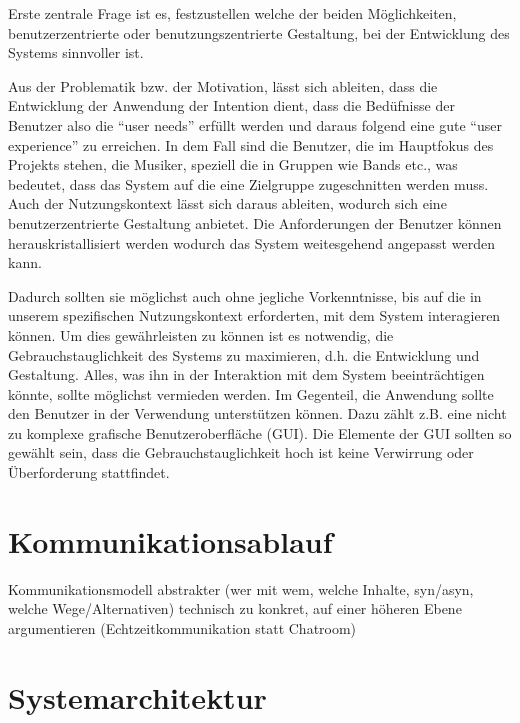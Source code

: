 \documentclass[12pt]{scrartcl}
\begin{document}
Erste zentrale Frage ist es, festzustellen welche der beiden Möglichkeiten, benutzerzentrierte oder benutzungszentrierte Gestaltung, bei der Entwicklung des Systems sinnvoller ist.

Aus der Problematik bzw. der Motivation, lässt sich ableiten, dass die Entwicklung der Anwendung der Intention dient, dass die Bedüfnisse der Benutzer also die “user needs” erfüllt werden und daraus folgend eine gute “user experience” zu erreichen. 
In dem Fall sind die Benutzer, die im Hauptfokus des Projekts stehen, die Musiker, speziell die in Gruppen wie Bands etc., was bedeutet, dass das System auf die eine Zielgruppe zugeschnitten werden muss. Auch der Nutzungskontext lässt sich daraus ableiten, wodurch sich eine benutzerzentrierte Gestaltung anbietet. Die Anforderungen der Benutzer können herauskristallisiert werden wodurch das System weitesgehend angepasst werden kann.

Dadurch sollten sie möglichst auch ohne jegliche Vorkenntnisse, bis auf die in unserem spezifischen Nutzungskontext erforderten, mit dem System interagieren können.
Um dies gewährleisten zu können ist es notwendig, die Gebrauchstauglichkeit des Systems zu maximieren, d.h. die Entwicklung und Gestaltung. Alles, was ihn in der Interaktion mit dem System beeinträchtigen könnte, sollte möglichst vermieden werden. Im Gegenteil, die Anwendung sollte den Benutzer in der Verwendung unterstützen können. Dazu zählt z.B. eine nicht zu komplexe grafische Benutzeroberfläche (GUI). Die Elemente der GUI sollten so gewählt sein, dass die Gebrauchstauglichkeit hoch ist keine Verwirrung oder Überforderung stattfindet.



\section{Kommunikationsablauf}

Kommunikationsmodell abstrakter (wer mit wem, welche Inhalte, syn/asyn, welche Wege/Alternativen)
technisch zu konkret, auf einer höheren Ebene argumentieren (Echtzeitkommunikation statt Chatroom)




\section{Systemarchitektur}
\end{document}
